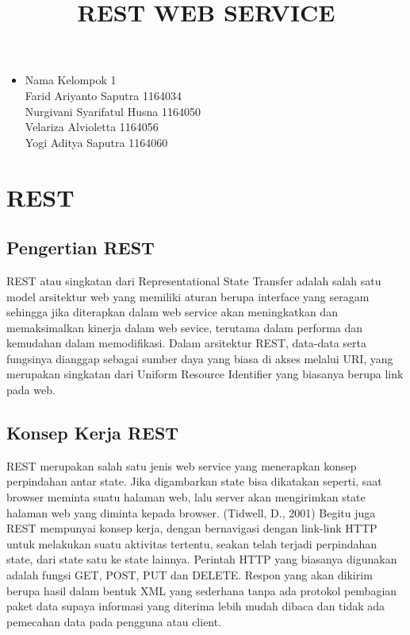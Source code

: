 \documentclass[12pt,a4paper]{article}
\begin{document}
\title{REST WEB SERVICE}
\maketitle

\begin{itemize}
\item
Nama Kelompok 1\\
Farid Ariyanto Saputra 1164034\\
Nurgivani Syarifatul Husna 1164050\\
Velariza Alvioletta 1164056\\
Yogi Aditya Saputra 1164060 \\
\end{itemize}

\section{REST}
\subsection{Pengertian REST}
REST atau singkatan dari Representational State Transfer adalah salah satu model arsitektur web yang memiliki aturan berupa interface yang seragam sehingga jika diterapkan dalam web service akan meningkatkan dan memaksimalkan kinerja dalam web sevice, terutama dalam performa dan kemudahan dalam memodifikasi. Dalam arsitektur REST, data-data serta fungsinya dianggap sebagai sumber daya yang biasa di akses melalui URI, yang merupakan singkatan dari Uniform Resource Identifier yang biasanya berupa link pada web.
\subsection{Konsep Kerja REST}
REST merupakan salah satu jenis web service yang menerapkan konsep perpindahan antar state. Jika digambarkan state bisa dikatakan seperti, saat browser meminta suatu halaman web, lalu server akan mengirimkan state halaman web yang diminta kepada browser. (Tidwell, D., 2001) Begitu juga REST mempunyai konsep kerja, dengan bernavigasi dengan link-link HTTP untuk melakukan suatu aktivitas tertentu, seakan telah terjadi perpindahan state, dari state satu ke state lainnya. Perintah  HTTP yang biasanya digunakan adalah fungsi GET, POST, PUT dan DELETE. Respon yang akan dikirim berupa hasil dalam bentuk XML yang sederhana tanpa ada protokol pembagian paket data supaya informasi yang diterima lebih mudah dibaca dan tidak ada pemecahan data pada pengguna atau client.
\end{document}

